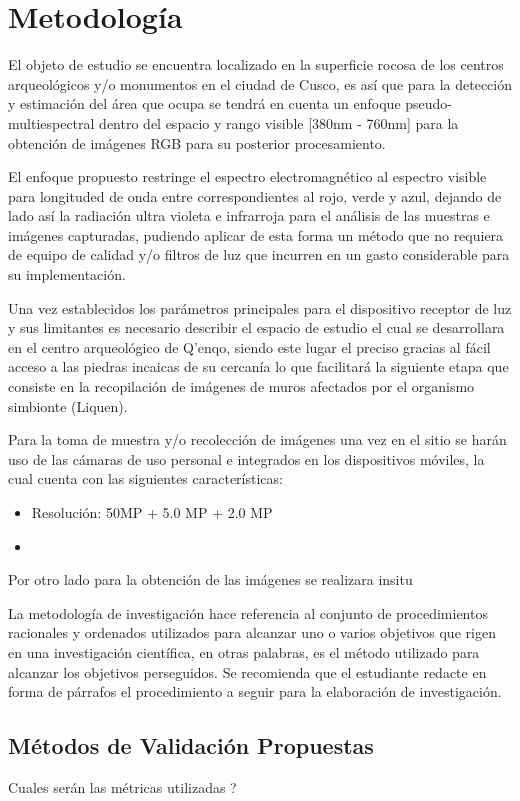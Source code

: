 \chapter{Metodología}

El objeto de estudio se encuentra localizado en la superficie rocosa de los centros arqueológicos y/o monumentos en el ciudad de Cusco, es así que para la detección y estimación del área que ocupa se tendrá en cuenta un enfoque pseudo-multiespectral dentro del espacio y rango visible [380nm - 760nm] para la obtención de imágenes RGB para su posterior procesamiento.

El enfoque propuesto restringe el espectro electromagnético al espectro visible para longituded de onda entre correspondientes al rojo, verde y azul, dejando de lado así la radiación ultra violeta e infrarroja para el análisis de las muestras e imágenes capturadas, pudiendo aplicar de esta forma un método que no requiera de equipo de calidad y/o filtros de luz que incurren en un gasto considerable para su implementación.

Una vez establecidos los parámetros principales para el dispositivo receptor de luz y sus limitantes es necesario describir el espacio de estudio el cual se desarrollara en el centro arqueológico de Q'enqo, siendo este lugar el preciso gracias al fácil acceso a las piedras incaicas de su cercanía lo que facilitará la siguiente etapa que consiste en la recopilación de imágenes de muros afectados por el organismo simbionte (Liquen).

Para la toma de muestra y/o recolección de imágenes una vez en el sitio se harán uso de las cámaras de uso personal e integrados en los dispositivos móviles, la cual cuenta con las siguientes características:

\begin{itemize}
	\item Resolución: 50MP + 5.0 MP + 2.0 MP
	\item 
\end{itemize} 


Por otro lado para la obtención de las imágenes se realizara insitu

La metodología de investigación hace referencia al conjunto de procedimientos racionales y ordenados utilizados para alcanzar uno o varios objetivos que rigen en una investigación científica, en otras palabras, es el método utilizado para alcanzar los objetivos perseguidos. Se recomienda que el estudiante redacte en forma de párrafos el procedimiento a seguir para la elaboración de investigación.

\section{Métodos de Validación Propuestas}
Cuales serán las métricas utilizadas ?


